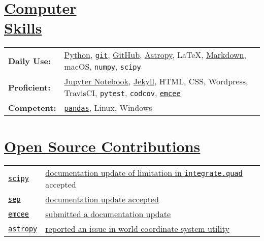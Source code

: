 \documentclass[margin]{res}
\begin{document}
\begin{resume}
\section{\href{https://github.com/benjaminrose}{Computer \\Skills}}
 \hspace{-1em}
 \begin{tabular}{l p{4.5in}}
{\bf Daily Use:} & \href{https://www.python.org}{Python}, \href{https://git-scm.com}{\texttt{git}}, \href{https://github.com/benjaminrose}{GitHub}, \href{http://www.astropy.org}{Astropy}, \LaTeX, \href{http://daringfireball.net/projects/markdown/}{Markdown}, macOS, \texttt{numpy}, \texttt{scipy}\\
{\bf Proficient:} &  \href{http://jupyter.org}{Jupyter Notebook}, \href{https://jekyllrb.com}{Jekyll}, HTML, CSS, Wordpress, TravisCI, \texttt{pytest}, \texttt{codcov}, \href{http://dan.iel.fm/emcee/current/}{\texttt{emcee}}\\
{\bf Competent:} & \href{http://pandas.pydata.org}{\texttt{pandas}}, Linux, Windows %
\end{tabular}

\section{\href{https://github.com/benjaminrose}{Open Source Contributions}}
\hspace{-1em}
\begin{tabular}{l p{4.9in}}
\href{https://www.scipy.org}{\texttt{scipy}} & \href{https://github.com/scipy/scipy/pull/8011}{documentation update of limitation in \texttt{integrate.quad}} accepted\\

\href{http://sep.readthedocs.io/en/v1.0.x/}{\texttt{sep}} & \href{https://github.com/kbarbary/sep/commit/612033788bcce44f110a87e1b54bb70eea9960c2}{documentation update accepted} \\

\href{http://dan.iel.fm/emcee/current/}{\texttt{emcee}} & \href{https://github.com/dfm/emcee/pull/212}{submitted a documentation update} \\

\href{http://www.astropy.org}{\texttt{astropy}} & \href{https://github.com/astropy/astropy/issues/4976}{reported an issue in world coordinate system utility} 


\end{tabular}
\end{resume}
\end{document}
